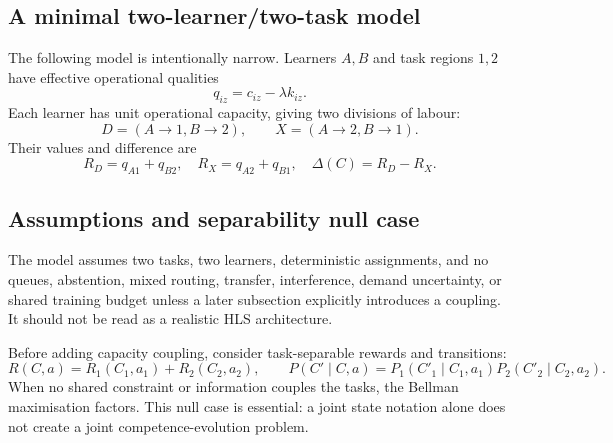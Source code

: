 \subsection{A minimal two-learner/two-task model}

The following model is intentionally narrow. Learners $A,B$ and task regions $1,2$ have effective operational qualities
\begin{equation}
q_{iz}=c_{iz}-\lambda k_{iz}.
\label{eq:quality}
\end{equation}
Each learner has unit operational capacity, giving two divisions of labour:
\begin{equation}
D=(A\!\rightarrow\!1,B\!\rightarrow\!2),\qquad
X=(A\!\rightarrow\!2,B\!\rightarrow\!1).
\label{eq:divisions}
\end{equation}
Their values and difference are
\begin{equation}
R_D=q_{A1}+q_{B2},\quad R_X=q_{A2}+q_{B1},\quad
\Delta(C)=R_D-R_X.
\label{eq:division-values}
\end{equation}

\subsection{Assumptions and separability null case}

The model assumes two tasks, two learners, deterministic assignments, and no queues, abstention, mixed routing, transfer, interference, demand uncertainty, or shared training budget unless a later subsection explicitly introduces a coupling. It should not be read as a realistic HLS architecture.

Before adding capacity coupling, consider task-separable rewards and transitions:
\begin{equation}
R(C,a)=R_1(C_1,a_1)+R_2(C_2,a_2),\qquad
P(C'\mid C,a)=P_1(C'_1\mid C_1,a_1)P_2(C'_2\mid C_2,a_2).
\label{eq:separable}
\end{equation}
When no shared constraint or information couples the tasks, the Bellman maximisation factors. This null case is essential: a joint state notation alone does not create a joint competence-evolution problem.
